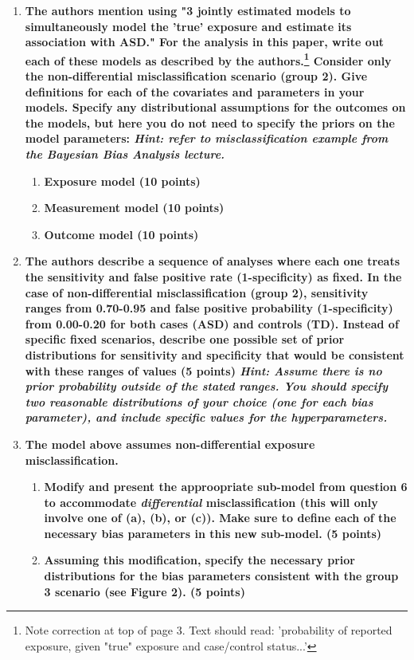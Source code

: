 \documentclass[
  11pt,
]{article}
\begin{document}
\begin{enumerate}[label=\textbf{\arabic*.}]\addtocounter{enumi}{5}
  \item \textbf{The authors mention using "3 jointly estimated models to simultaneously model the 'true' exposure and estimate its association with ASD." For the analysis in this paper, write out each of these models as described by the authors.\footnote{Note correction at top of page 3. Text should read: ’probability of reported exposure, given "true" exposure and case/control status...’} Consider only the non-differential misclassification scenario (group 2). Give definitions for each of the covariates and parameters in your models. Specify any distributional assumptions for the outcomes on the models, but here you do not need to specify the priors on the model parameters: \textit{Hint: refer to misclassification example from the Bayesian Bias Analysis lecture.}}
  \begin{enumerate}[label=\textbf{\alph*.}]
    \item \textbf{Exposure model (10 points)}
    \item \textbf{Measurement model (10 points)}
    \item \textbf{Outcome model (10 points)}
  \end{enumerate}


\newpage

  \item \textbf{The authors describe a sequence of analyses where each one treats the sensitivity and false positive rate (1-specificity) as fixed. In the case of non-differential misclassification (group 2), sensitivity ranges from 0.70-0.95 and false positive probability (1-specificity) from 0.00-0.20 for both cases (ASD) and controls (TD). Instead of specific fixed scenarios, describe one possible set of prior distributions for sensitivity and specificity that would be consistent with these ranges of values (5 points) \textit{Hint: Assume there is no prior probability outside of the stated ranges. You should specify two reasonable distributions of your choice (one for each bias parameter), and include specific values for the hyperparameters.}}
  
\newpage

  \item \textbf{The model above assumes non-differential exposure misclassification.}
  \begin{enumerate}[label=\alph*]
    \item \textbf{Modify and present the approopriate sub-model from question 6 to accommodate \textit{differential} misclassification (this will only involve one of (a), (b), or (c)). Make sure to define each of the necessary bias parameters in this new sub-model. (5 points)}
    \item \textbf{Assuming this modification, specify the necessary prior distributions for the bias parameters consistent with the group 3 scenario (see Figure 2). (5 points)}
  \end{enumerate}
\end{enumerate}
\end{document}

